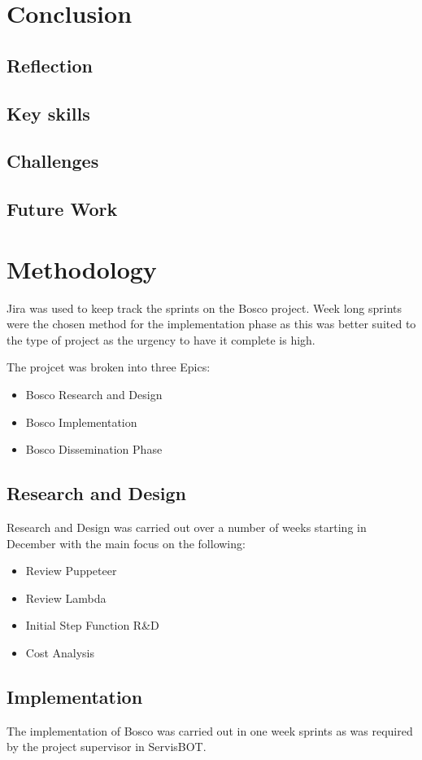 \documentclass[12pt,a4paper,titlepage]{report}
\begin{document}
\chapter{Conclusion}
\section{Reflection}
\section{Key skills}
\section{Challenges}
\section{Future Work}

\appendix
\chapter{Methodology}
Jira was used to keep track the sprints on the Bosco project. Week long sprints were the chosen method for the implementation phase as this
was better suited to the type of project as the urgency to have it complete is high.

The projcet was broken into three Epics:

\begin{itemize}
  \item Bosco Research and Design
  \item Bosco Implementation
  \item Bosco Dissemination Phase
\end{itemize}
\section{Research and Design}
Research and Design was carried out over a number of weeks starting in December with the main focus on the following:
\begin{itemize}
\item Review Puppeteer
\item Review Lambda
\item Initial Step Function R\&D
\item Cost Analysis
\end{itemize}

\section{Implementation}
The implementation of Bosco was carried out in one week sprints as was required by the project supervisor in ServisBOT\@. 
\end{document}
